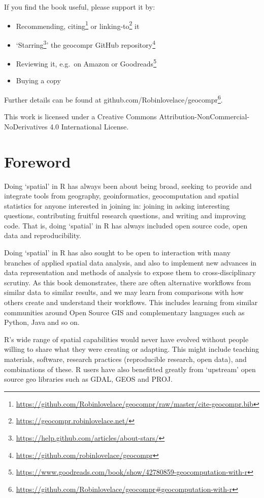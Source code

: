 \documentclass[]{krantz}
\providecommand{\tightlist}{%
  \setlength{\itemsep}{0pt}\setlength{\parskip}{0pt}}
\let\rmarkdownfootnote\footnote%
\def\footnote{\protect\rmarkdownfootnote}
\renewcommand{\href}[2]{#2\footnote{\url{#1}}}
\begin{document}
If you find the book useful, please support it by:

\begin{itemize}
\tightlist
\item
  Recommending, \href{https://github.com/Robinlovelace/geocompr/raw/master/cite-geocompr.bib}{citing} or \href{https://geocompr.robinlovelace.net/}{linking-to} it
\item
  `\href{https://help.github.com/articles/about-stars/}{Starring}' the \href{https://github.com/robinlovelace/geocompr}{geocompr GitHub repository}
\item
  Reviewing it, e.g.~on Amazon or \href{https://www.goodreads.com/book/show/42780859-geocomputation-with-r}{Goodreads}
\item
  Buying a copy
\end{itemize}

Further details can be found at \href{https://github.com/Robinlovelace/geocompr\#geocomputation-with-r}{github.com/Robinlovelace/geocompr}.

This work is licensed under a Creative Commons Attribution-NonCommercial-NoDerivatives 4.0 International License.

\hypertarget{foreword}{%
\section*{Foreword}\label{foreword}}

Doing `spatial' in R has always been about being broad, seeking to provide and integrate tools from geography, geoinformatics, geocomputation and spatial statistics for anyone interested in joining in: joining in asking interesting questions, contributing fruitful research questions, and writing and improving code. That is, doing `spatial' in R has always included open source code, open data and reproducibility.

Doing `spatial' in R has also sought to be open to interaction with many branches of applied spatial data analysis, and also to implement new advances in data representation and methods of analysis to expose them to cross-disciplinary scrutiny. As this book demonstrates, there are often alternative workflows from similar data to similar results, and we may learn from comparisons with how others create and understand their workflows. This includes learning from similar communities around Open Source GIS and complementary languages such as Python, Java and so on.

R's wide range of spatial capabilities would never have evolved without people willing to share what they were creating or adapting. This might include teaching materials, software, research practices (reproducible research, open data), and combinations of these. R users have also benefitted greatly from `upstream' open source geo libraries such as GDAL, GEOS and PROJ.
\end{document}
